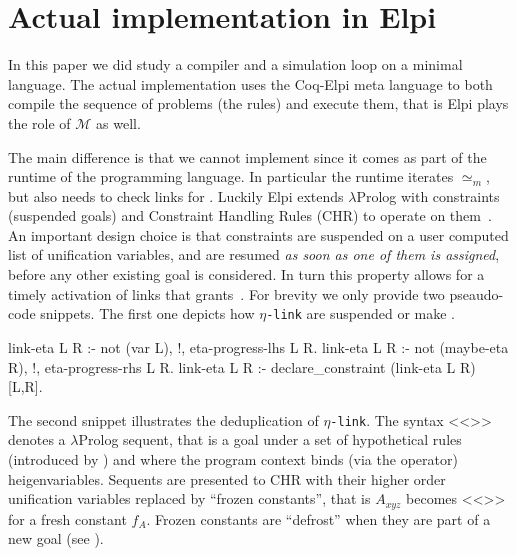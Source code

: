 \documentclass[sigconf,natbib=false,review]{acmart}
\newcommand{\UnifRel}{\ensuremath{\simeq}}
\newcommand{\Ue}{\ensuremath{\UnifRel_m}\xspace}
\newcommand{\llambda}{\ensuremath{\mathcal{L}}\xspace}
\newcommand{\linkMacro}[1]{\ensuremath{#1}\texttt{-link}\xspace}
\newcommand{\linketa} {\linkMacro{\eta}}
\newcommand{\Ho}{\texorpdfstring{\ensuremath{\mathcal{M}}\xspace}{M}}
\begin{document}
%
\section{Actual implementation in Elpi}\label{sec:implementation}

In this paper we did study a compiler and a simulation loop on a minimal language.
The actual implementation uses the Coq-Elpi meta language to both compile
the sequence of problems (the rules) and execute them, that is Elpi
plays the role of \Ho{} as well.

The main difference is that we cannot implement \hrun since it comes as part of
the runtime of the programming language. In particular the runtime iterates
\Ue, but \hstep also needs to check links for \progress. Luckily Elpi extends
$\lambda$Prolog with constraints (suspended goals) and
Constraint Handling Rules (CHR) to operate on them~\cite{TASSI_2019,fruehwirth2017constraint}.
An important design choice is that constraints are suspended on a user
computed list of unification variables, and are resumed \emph{as soon as one of them
is assigned}, before any other existing goal is considered. In turn this
property allows for a timely activation of links that grants~.
For brevity we only provide two pseaudo-code snippets. The first one depicts
how \linketa are suspended or make \progress.

\begin{elpicode}
link-eta L R :- not (var L), !, eta-progress-lhs L R.
link-eta L R :- not (maybe-eta R), !, eta-progress-rhs L R.
link-eta L R :- declare_constraint (link-eta L R) [L,R].
\end{elpicode}

\noindent
The second snippet illustrates the deduplication of \linketa. The syntax
<<>> denotes a $\lambda$Prolog sequent, that is a 
goal  under a set  of hypothetical rules (introduced
by \elpiIn{=>}) and where the program context binds (via the 
operator)  heigenvariables. Sequents are presented to
CHR with their higher order unification variables replaced by
``frozen constants'', that is $A_{xyz}$ becomes <<>>
for a fresh constant $f_A$. Frozen constants are ``defrost'' when
they are part of a new goal (see \cite[section 4.3]{TASSI_2019}).
\end{document}
